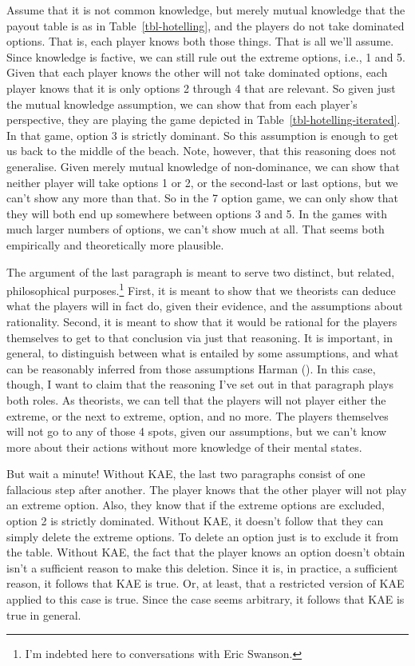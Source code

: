 \documentclass[
  10pt,
  letterpaper,
  twoside]{scrbook}
\begin{document}
Assume that it is not common knowledge, but merely mutual knowledge that
the payout table is as in Table~\ref{tbl-hotelling}, and the players do
not take dominated options. That is, each player knows both those
things. That is all we'll assume. Since knowledge is factive, we can
still rule out the extreme options, i.e., 1 and 5. Given that each
player knows the other will not take dominated options, each player
knows that it is only options 2 through 4 that are relevant. So given
just the mutual knowledge assumption, we can show that from each
player's perspective, they are playing the game depicted in
Table~\ref{tbl-hotelling-iterated}. In that game, option 3 is strictly
dominant. So this assumption is enough to get us back to the middle of
the beach. Note, however, that this reasoning does not generalise. Given
merely mutual knowledge of non-dominance, we can show that neither
player will take options 1 or 2, or the second-last or last options, but
we can't show any more than that. So in the 7 option game, we can only
show that they will both end up somewhere between options 3 and 5. In
the games with much larger numbers of options, we can't show much at
all. That seems both empirically and theoretically more plausible.

The argument of the last paragraph is meant to serve two distinct, but
related, philosophical purposes.\footnote{I'm indebted here to
  conversations with Eric Swanson.} First, it is meant to show that we
theorists can deduce what the players will in fact do, given their
evidence, and the assumptions about rationality. Second, it is meant to
show that it would be rational for the players themselves to get to that
conclusion via just that reasoning. It is important, in general, to
distinguish between what is entailed by some assumptions, and what can
be reasonably inferred from those assumptions Harman
(). In this case, though, I want to claim
that the reasoning I've set out in that paragraph plays both roles. As
theorists, we can tell that the players will not player either the
extreme, or the next to extreme, option, and no more. The players
themselves will not go to any of those 4 spots, given our assumptions,
but we can't know more about their actions without more knowledge of
their mental states.

But wait a minute! Without KAE, the last two paragraphs consist of one
fallacious step after another. The player knows that the other player
will not play an extreme option. Also, they know that if the extreme
options are excluded, option 2 is strictly dominated. Without KAE, it
doesn't follow that they can simply delete the extreme options. To
delete an option just is to exclude it from the table. Without KAE, the
fact that the player knows an option doesn't obtain isn't a sufficient
reason to make this deletion. Since it is, in practice, a sufficient
reason, it follows that KAE is true. Or, at least, that a restricted
version of KAE applied to this case is true. Since the case seems
arbitrary, it follows that KAE is true in general.
\end{document}
